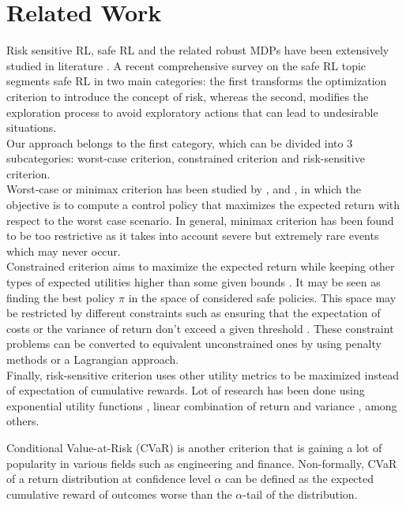 \section{Related Work}

Risk sensitive RL, safe RL and the related robust MDPs have been extensively studied in 
literature \citep{Bagnell2001, Morimoto2005,Pinto2017}.
A recent comprehensive survey on the safe RL topic \citep{Garcia2015} segments safe RL
in two main categories: the first transforms
the optimization criterion to introduce the concept of risk, whereas the second, modifies
the exploration process to avoid exploratory actions that can lead to undesirable situations.\\
Our approach belongs to the first category, which can be divided into 3 subcategories: worst-case
criterion, constrained criterion and risk-sensitive criterion.\\
Worst-case or minimax criterion has been studied by \citet{Heger1994}, 
\citet{Coraluppi1997} and \citet{Coraluppi1999},
in which the objective is to compute a control policy that maximizes the expected return
with respect to the worst case scenario. In general, minimax criterion has
been found to be too restrictive as it takes into
account severe but extremely rare events which may never occur.\\
Constrained criterion  aims to maximize the expected return while keeping
other types of expected utilities higher than some given bounds \citep{Altman1993}.
It may be seen as finding the best policy $\pi$ in the space of considered safe policies.
This space may be restricted by different constraints such as ensuring that
the expectation of costs \citep{Geibel2006} or the variance of return don't exceed
a given threshold \citep{Tamar2012}.
These constraint problems can be converted to equivalent unconstrained ones by using
penalty methods or a Lagrangian approach.\\
Finally, risk-sensitive criterion uses other utility metrics to be maximized instead of
expectation of cumulative rewards.
Lot of research has been done using exponential utility functions
\citep{Howard1972,Chung1987}, linear combination
of return and variance \citep{Sato2001}, among others.

Conditional Value-at-Risk (CVaR) is another criterion that is gaining a lot of popularity in various
fields such as engineering and finance.
Non-formally, CVaR of a return distribution at confidence level $\alpha$ can be defined as the expected
cumulative reward of outcomes worse than the $\alpha$-tail of the distribution.

